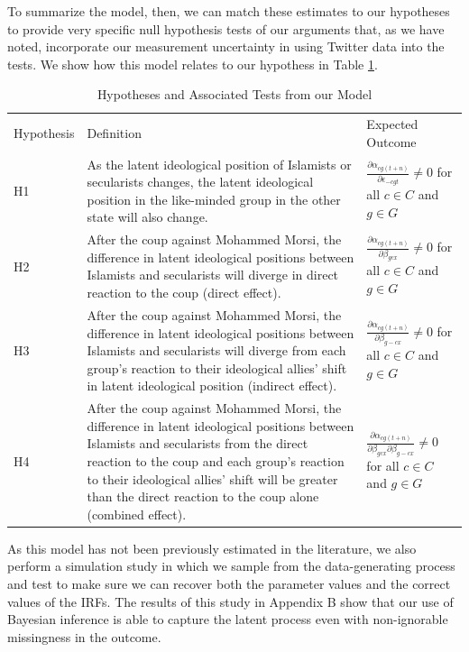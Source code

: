 \documentclass[12pt]{article}
\begin{document}
To summarize the model, then, we can match these estimates to our hypotheses to provide very specific null hypothesis tests of our arguments that, as we have noted, incorporate our measurement uncertainty in using Twitter data into the tests. We show how this model relates to our hypothess in Table \ref{Htests}.
\begin{table}[h!]
	\centering
	\caption{Hypotheses and Associated Tests from our Model}\label{Htests}
	\scriptsize
	\begin{tabular}{lp{7cm}l}
		Hypothesis & Definition & Expected Outcome\\
		H1 & As the latent ideological position of Islamists or secularists changes, the latent ideological position in the like-minded group in the other state will also change. & $\frac{\partial \alpha_{cg(t+n)}}{\partial \epsilon_{-cgt}}\neq0$ for all $c \in C$ and $g \in G$\\[1em]
		H2 & After the coup against Mohammed Morsi, the difference in latent ideological positions between Islamists and secularists will diverge in direct reaction to the coup (direct effect). & $\frac{\partial \alpha_{cg(t+n)}}{\partial \beta_{gcx}}\neq0$ for all $c \in C$ and $g \in G$\\[1em]
		H3 & After the coup against Mohammed Morsi, the difference in latent ideological positions between Islamists and secularists will diverge from each group's reaction to their ideological allies' shift in latent ideological position (indirect effect). & $\frac{\partial \alpha_{cg(t+n)}}{\partial \beta_{g-cx}}\neq0$ for all $c \in C$ and $g \in G$\\[1em]
		H4 & After the coup against Mohammed Morsi, the difference in latent ideological positions between Islamists and secularists from the direct reaction to the coup and each group's reaction to their ideological allies' shift will be greater than the direct reaction to the coup alone (combined effect). & $\frac{\partial \alpha_{cg(t+n)}}{\partial \beta_{gcx}\partial \beta_{g-cx}}\neq0$ for all $c \in C$ and $g \in G$
	\end{tabular}
\end{table}

As this model has not been previously estimated in the literature, we also perform a simulation study in which we sample from the data-generating process and test to make sure we can recover both the parameter values and the correct values of the IRFs. The results of this study in Appendix B show that our use of Bayesian inference is able to capture the latent process even with non-ignorable missingness in the outcome.
\end{document}
